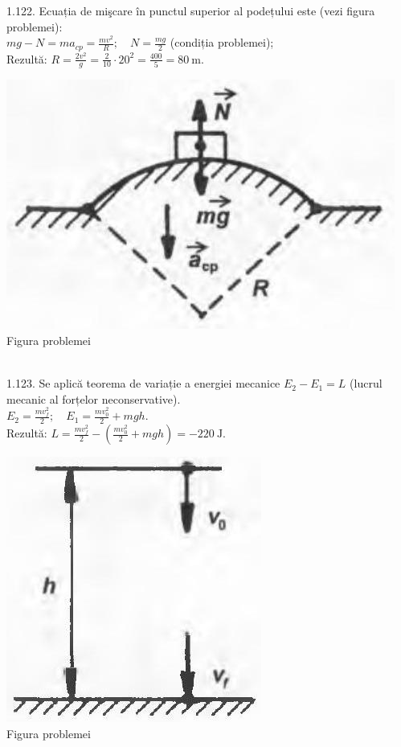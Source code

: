 1.122. Ecuația de mişcare în punctul superior al podețului este (vezi figura problemei):\\ $m g-N=m a_{c p}=\frac{m v^{2}}{R}; \quad N=\frac{m g}{2}$ (condiția problemei);\\ Rezultă: $R=\frac{2 v^{2}}{g}=\frac{2}{10} \cdot 20^{2}=\frac{400}{5}=80 \mathrm{~m}$.\\ \begin{center} \includegraphics[width=0.4\linewidth]{images/2025_07_01_5b3ff9fa0d508c8e9f17g-223(1)}\\ Figura problemei \end{center}\\

1.123. Se aplică teorema de variație a energiei mecanice $E_{2}-E_{1}=L$ (lucrul mecanic al forțelor neconservative).\\ $E_{2}=\frac{m v_{f}^{2}}{2}; \quad E_{1}=\frac{m v_{0}^{2}}{2}+m g h$.\\ Rezultă: $L=\frac{m v_{f}^{2}}{2}-\left(\frac{m v_{0}^{2}}{2}+m g h\right)=-220 \mathrm{~J}$.\\ \begin{center} \includegraphics[width=0.4\linewidth]{images/2025_07_01_5b3ff9fa0d508c8e9f17g-224}\\ Figura problemei \end{center}\\

